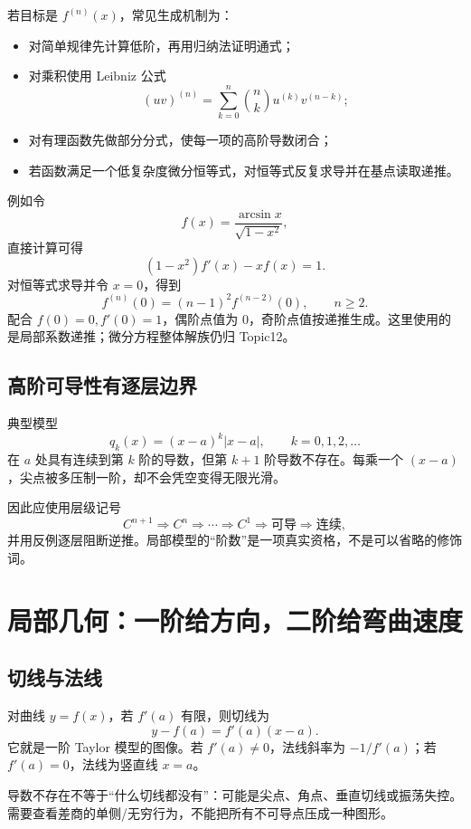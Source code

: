 \documentclass[11pt,a4paper]{ctexart}
\begin{document}
若目标是 $f^{(n)}(x)$，常见生成机制为：
\begin{itemize}
  \item 对简单规律先计算低阶，再用归纳法证明通式；
  \item 对乘积使用 Leibniz 公式
  \[
  {(uv)}^{(n)}=\sum_{k=0}^{n}\binom{n}{k}u^{(k)}v^{(n-k)};
  \]
  \item 对有理函数先做部分分式，使每一项的高阶导数闭合；
  \item 若函数满足一个低复杂度微分恒等式，对恒等式反复求导并在基点读取递推。
\end{itemize}

例如令
\[
f(x)=\frac{\arcsin x}{\sqrt{1-x^2}},
\]
直接计算可得
\[
(1-x^2)f'(x)-xf(x)=1.
\]
对恒等式求导并令 $x=0$，得到
\[
f^{(n)}(0)={(n-1)}^2f^{(n-2)}(0),
\qquad n\ge2.
\]
配合 $f(0)=0,f'(0)=1$，偶阶点值为 $0$，奇阶点值按递推生成。这里使用的是局部系数递推；微分方程整体解族仍归 Topic12。

\subsection{高阶可导性有逐层边界}

典型模型
\[
q_k(x)={(x-a)}^k|x-a|,
\qquad k=0,1,2,\ldots
\]
在 $a$ 处具有连续到第 $k$ 阶的导数，但第 $k+1$ 阶导数不存在。每乘一个 $(x-a)$，尖点被多压制一阶，却不会凭空变得无限光滑。

因此应使用层级记号
\[
C^{n+1}\Longrightarrow C^n\Longrightarrow\cdots\Longrightarrow C^1
\Longrightarrow\text{可导}\Longrightarrow\text{连续},
\]
并用反例逐层阻断逆推。局部模型的“阶数”是一项真实资格，不是可以省略的修饰词。

\section{局部几何：一阶给方向，二阶给弯曲速度}

\subsection{切线与法线}

对曲线 $y=f(x)$，若 $f'(a)$ 有限，则切线为
\[
y-f(a)=f'(a)(x-a).
\]
它就是一阶 Taylor 模型的图像。若 $f'(a)\ne0$，法线斜率为 $-1/f'(a)$；若 $f'(a)=0$，法线为竖直线 $x=a$。

导数不存在不等于“什么切线都没有”：可能是尖点、角点、垂直切线或振荡失控。需要查看差商的单侧/无穷行为，不能把所有不可导点压成一种图形。
\end{document}
